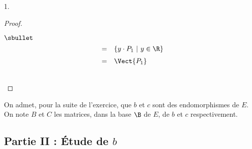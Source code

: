 \documentclass[11pt]{article}%
\begin{document}
\begin{noliste}{1.}
\begin{proof}
\begin{remark}
\begin{noliste}{$\sbullet$}
\[\begin{array}{rcl}
          & = & \left\{ 
            y \cdot P_1 \ \vert \
            y \in \R
          \right\}
          \\[.2cm]
          & = & \Vect{P_1}
	\end{array}
	\]
      \end{noliste}
    \end{remark}~\\[-1.2cm]
  \end{proof}
  On admet, pour la suite de l'exercice, que $b$ et $c$ sont des
  endomorphismes de $E$.\\
  On note $B$ et $C$ les matrices, dans la base $\B$ de $E$, de $b$ et
  $c$ respectivement.
\end{noliste}


\newpage


\subsection*{Partie II : Étude de $b$}
\end{document}

